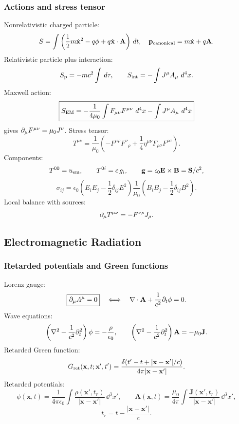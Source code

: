 \subsubsection*{Actions and stress tensor}
Nonrelativistic charged particle:
\[
S=\int\left(\frac12m\dot{\mathbf x}^2-q\phi+q\dot{\mathbf x}\cdot\mathbf A\right)\,d t,
\quad
\mathbf p_{\rm canonical}=m\dot{\mathbf x}+q\mathbf A.
\]
Relativistic particle plus interaction:
\[
S_{\rm p}=-mc^2\int\,d\tau,\qquad
S_{\rm int}=-\int J^\mu A_\mu\,\,d^4x.
\]
Maxwell action:
\[
\boxed{S_{\rm EM}=-\frac{1}{4\mu_0}\int F_{\mu\nu}F^{\mu\nu}\,\,d^4x
-\int J^\mu A_\mu\,\,d^4x}
\]
gives $\partial_\mu F^{\mu\nu}=\mu_0J^\nu$. Stress tensor:
\[
\boxed{T^{\mu\nu}=\frac{1}{\mu_0}
\left(-F^{\mu\rho}F^\nu{}_\rho+\frac14\eta^{\mu\nu}F_{\rho\sigma}F^{\rho\sigma}\right)}.
\]
Components:
\[
T^{00}=u_{\rm em},\qquad T^{0i}=c\,g_i,\qquad
\mathbf g=\epsilon_0\mathbf E\times\mathbf B=\mathbf S/c^2,
\]
\[
\sigma_{ij}=\epsilon_0\left(E_iE_j-\frac12\delta_{ij}E^2\right)
\frac{1}{\mu_0}\left(B_iB_j-\frac12\delta_{ij}B^2\right).
\]
Local balance with sources:
\[
\partial_\mu T^{\mu\nu}=-F^{\nu\rho}J_\rho.
\]

\subsection{Electromagnetic Radiation}

\subsubsection*{Retarded potentials and Green functions}
Lorenz gauge:
\[
\boxed{\partial_\mu A^\mu=0}\quad\Longleftrightarrow\quad
\nabla\cdot\mathbf A+\frac{1}{c^2}\partial_t\phi=0.
\]
Wave equations:
\[
\left(\nabla^2-\frac{1}{c^2}\partial_t^2\right)\phi=-\frac{\rho}{\epsilon_0},\qquad
\left(\nabla^2-\frac{1}{c^2}\partial_t^2\right)\mathbf A=-\mu_0\mathbf J.
\]
Retarded Green function:
\[
G_{\rm ret}(\mathbf x,t;\mathbf x',t')
=\frac{\delta(t'-t+|\mathbf x-\mathbf x'|/c)}
{4\pi|\mathbf x-\mathbf x'|}.
\]
Retarded potentials:
\[
\boxed{\phi(\mathbf x,t)=\frac{1}{4\pi\epsilon_0}\int
\frac{\rho(\mathbf x',t_r)}{|\mathbf x-\mathbf x'|}\,\dd^3x'},\qquad
\boxed{\mathbf A(\mathbf x,t)=\frac{\mu_0}{4\pi}\int
\frac{\mathbf J(\mathbf x',t_r)}{|\mathbf x-\mathbf x'|}\,\dd^3x'},
\]
\[
t_r=t-\frac{|\mathbf x-\mathbf x'|}{c}.
\]

